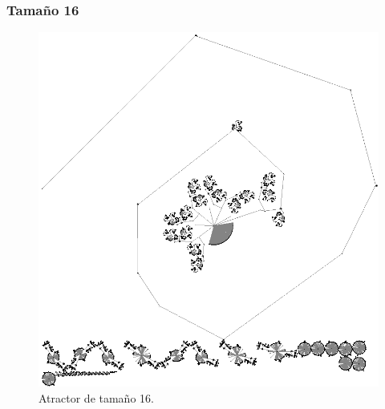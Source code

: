 \documentclass[11pt]{article}
\begin{document}
			\subsubsection{Tamaño 16}
			\begin{figure}[H]
			\centering
			\includegraphics[scale=0.8]{resources/Atractores22/atractor_22_size_16.png}
			\caption{Atractor de tamaño 16.}\label{fig:picture}
			\end{figure}
\end{document}
